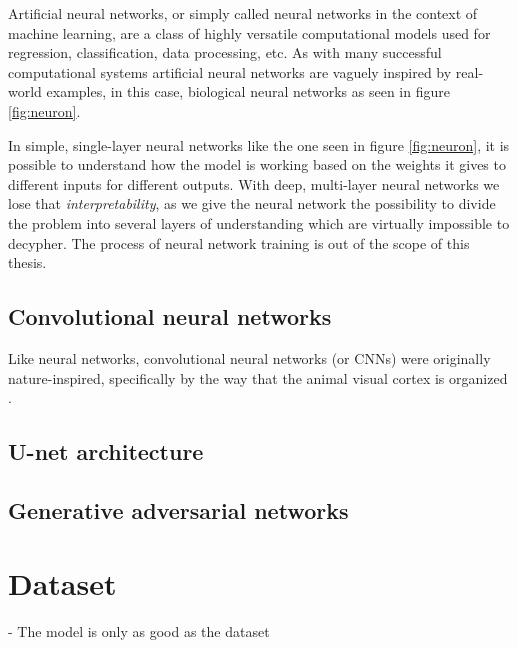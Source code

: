 Artificial neural networks, or simply called neural networks in the context of 
machine learning, are a class of highly versatile computational models used for 
regression, classification, data processing, etc. As with many successful computational 
systems artificial neural networks are vaguely inspired by real-world examples,
in this case, biological neural networks as seen in figure \ref{fig:neuron}. 

In simple, single-layer neural networks like the one seen in figure \ref{fig:neuron}, 
it is possible to understand how the model is working based on the weights it gives
to different inputs for different outputs. With deep, multi-layer neural networks 
we lose that \textit{interpretability}, as we give the neural network the possibility
to divide the problem into several layers of understanding which are virtually 
impossible to decypher. The process of neural network training is out of the scope
of this thesis.

\subsection{Convolutional neural networks}
\label{sec:cnn}

Like neural networks, convolutional neural networks (or CNNs) were originally 
nature-inspired, specifically by the way that the animal visual cortex is organized \citep{fukushima1980neocognitron}.



\subsection{U-net architecture}
\subsection{Generative adversarial networks}

\section{Dataset}
\label{sec:dataset}

- The model is only as good as the dataset
